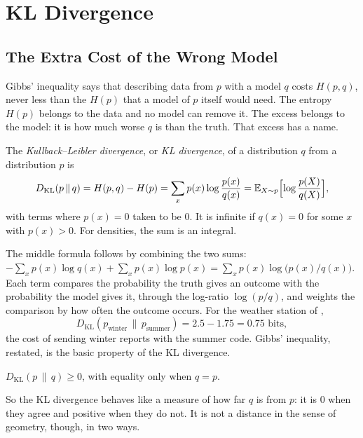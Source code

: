 \section{KL Divergence}
\label{sec:ch07-kl}

\subsection{The Extra Cost of the Wrong Model}
\label{sec:ch07-kl-def}

Gibbs' inequality says that describing data from $p$ with a model $q$
costs $H(p, q)$, never less than the $H(p)$ that a model of $p$ itself
would need. The entropy $H(p)$ belongs to the data and no model can
remove it. The excess belongs to the model: it is how much worse $q$ is
than the truth. That excess has a name.

\begin{definition}[KL divergence]
  \label{def:kl}
  The \emph{Kullback--Leibler divergence}, or \emph{KL divergence}, of a
  distribution $q$ from a distribution $p$ is
  \[
    D_{\mathrm{KL}}(p \,\|\, q) = H(p, q) - H(p)
    = \sum_x p(x) \log \frac{p(x)}{q(x)}
    = \mathbb{E}_{X \sim p}\Bigl[\log \frac{p(X)}{q(X)}\Bigr] ,
  \]
  with terms where $p(x) = 0$ taken to be $0$. It is infinite if $q(x)
  = 0$ for some $x$ with $p(x) > 0$. For densities, the sum is an
  integral.
\end{definition}

The middle formula follows by combining the two sums: $-\sum_x p(x) \log
q(x) + \sum_x p(x) \log p(x) = \sum_x p(x) \log\bigl(p(x)/q(x)\bigr)$.
Each term compares the probability the truth gives an outcome with the
probability the model gives it, through the log-ratio $\log(p/q)$, and
weights the comparison by how often the outcome occurs. For the weather
station of ,
\[
  D_{\mathrm{KL}}(p_{\text{winter}} \,\|\, p_{\text{summer}})
  = 2.5 - 1.75 = 0.75 \text{ bits},
\]
the cost of sending winter reports with the summer code. Gibbs'
inequality, restated, is the basic property of the KL divergence.

\begin{proposition}
  \label{prop:ch07-kl-nonneg}
  $D_{\mathrm{KL}}(p \,\|\, q) \ge 0$, with equality only when $q = p$.
\end{proposition}

So the KL divergence behaves like a measure of how far $q$ is from $p$:
it is $0$ when they agree and positive when they do not. It is not a
distance in the sense of geometry, though, in two ways.

